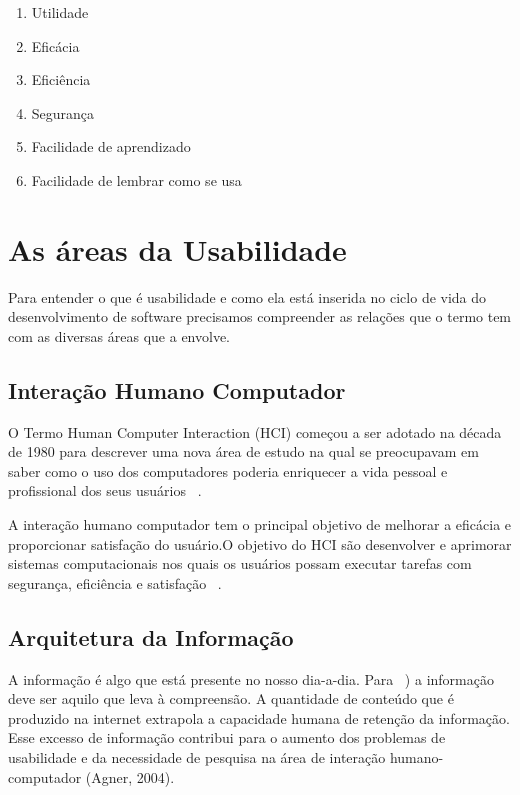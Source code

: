 \begin{enumerate}
\item Utilidade
\item Eficácia
\item Eficiência
\item Segurança
\item Facilidade de aprendizado
\item Facilidade de lembrar como se usa
\end{enumerate}


\section{As áreas da Usabilidade}

	Para entender o que é usabilidade e como ela está inserida no ciclo de vida do desenvolvimento de software precisamos compreender as relações que o termo tem com as diversas áreas que a envolve. 

\subsection{Interação Humano Computador}

	O Termo Human Computer Interaction  (HCI) começou a ser adotado na década de 1980 para descrever uma nova área de estudo na qual se preocupavam em saber como o uso dos computadores poderia enriquecer a vida pessoal e profissional dos seus usuários ~\cite{moraes2002}.
 
	A interação humano computador tem o principal objetivo de melhorar a eficácia e proporcionar satisfação do usuário.O objetivo do HCI são desenvolver e aprimorar sistemas computacionais nos quais os usuários possam executar tarefas com segurança, eficiência e satisfação ~\cite{preece2007}.
	
\subsection{Arquitetura da Informação}

A informação é algo que está presente no nosso dia-a-dia. Para ~\cite{wurman1991}) a informação deve ser aquilo que leva à compreensão. A quantidade de conteúdo que é produzido na internet extrapola a capacidade humana de retenção da informação. Esse excesso de informação contribui para o aumento dos problemas de usabilidade e da necessidade de pesquisa na área de interação humano-computador (Agner, 2004). %

